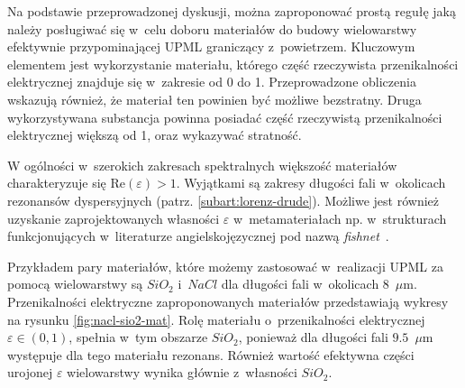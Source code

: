 Na podstawie przeprowadzonej dyskusji, można zaproponować prostą regułę jaką należy posługiwać się w~celu doboru materiałów do budowy wielowarstwy efektywnie przypominającej UPML graniczący z~powietrzem. Kluczowym elementem jest wykorzystanie materiału, którego część rzeczywista przenikalności elektrycznej znajduje się w~zakresie od 0 do 1. Przeprowadzone obliczenia wskazują również, że materiał ten powinien być możliwe bezstratny. Druga wykorzystywana substancja powinna posiadać część rzeczywistą przenikalności elektrycznej większą od 1, oraz wykazywać stratność. 

W ogólności w~szerokich zakresach spektralnych większość materiałów charakteryzuje się $\textrm{Re}(\varepsilon) > 1$. Wyjątkami są zakresy długości fali w~okolicach rezonansów dyspersyjnych (patrz. \ref{subart:lorenz-drude}). Możliwe jest również uzyskanie zaprojektowanych własności $\varepsilon$ w~metamateriałach np. w~strukturach funkcjonujących w~literaturze angielskojęzycznej pod nazwą \textit{fishnet}~\cite{valentine2008three}. 

Przykładem pary materiałów, które możemy zastosować w~realizacji UPML za pomocą wielowarstwy są $SiO_2$ i~$NaCl$ dla długości fali w~okolicach 8~$\mu$m. Przenikalności elektryczne zaproponowanych materiałów przedstawiają wykresy na rysunku \ref{fig:nacl-sio2-mat}. Rolę materiału o~przenikalności elektrycznej $\varepsilon \in (0,1)$, spełnia w~tym obszarze $SiO_2$, ponieważ dla długości fali $9.5$~$\mu$m występuje dla tego materiału rezonans. Również wartość efektywna części urojonej $\varepsilon$ wielowarstwy wynika głównie z~własności $SiO_2$. 

